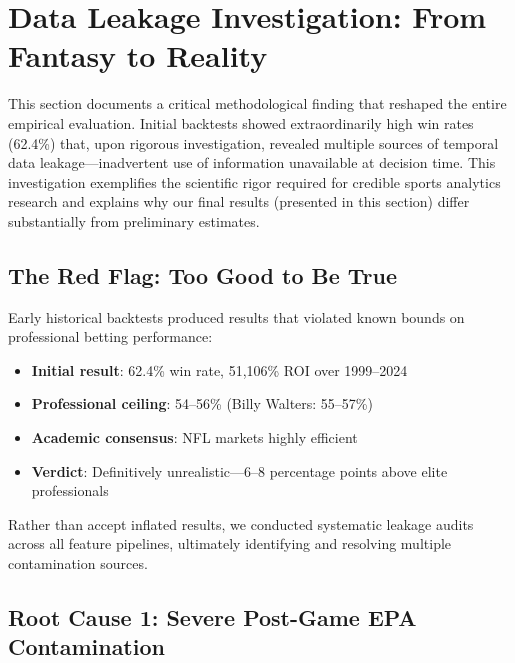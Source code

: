 
\section{Data Leakage Investigation: From Fantasy to Reality}
\label{sec:data-leakage-investigation}

This section documents a critical methodological finding that reshaped the entire empirical evaluation. Initial backtests showed extraordinarily high win rates (62.4\%) that, upon rigorous investigation, revealed multiple sources of temporal data leakage---inadvertent use of information unavailable at decision time. This investigation exemplifies the scientific rigor required for credible sports analytics research and explains why our final results (presented in this section) differ substantially from preliminary estimates.

\subsection{The Red Flag: Too Good to Be True}

Early historical backtests produced results that violated known bounds on professional betting performance:
\begin{itemize}
  \item \textbf{Initial result}: 62.4\% win rate, 51,106\% ROI over 1999--2024
  \item \textbf{Professional ceiling}: 54--56\% (Billy Walters: 55--57\%)
  \item \textbf{Academic consensus}: NFL markets highly efficient \citep{thaler1988anomalies,gray1997regression}
  \item \textbf{Verdict}: Definitively unrealistic---6--8 percentage points above elite professionals
\end{itemize}

Rather than accept inflated results, we conducted systematic leakage audits across all feature pipelines, ultimately identifying and resolving multiple contamination sources.

\subsection{Root Cause 1: Severe Post-Game EPA Contamination}

